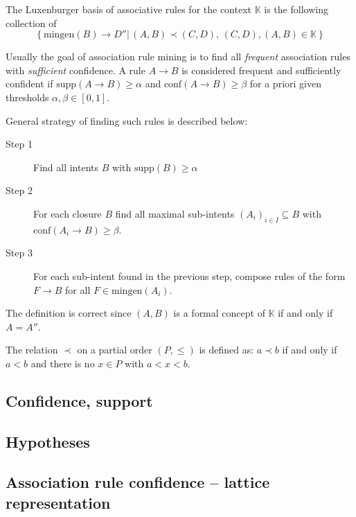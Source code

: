 \documentclass[a4paper]{article}
\newcommand{\obj}[1]{{\left\{ #1 \right \}}}
\newcommand{\clo}[1]{{\left [ #1 \right ]}}
\newcommand{\brac}[1]{{\left ( #1 \right )}}
\newcommand{\induc}[1]{{\left . #1 \right \vert}}
\newcommand{\Ctx}{\mathbb{K}}
\newcommand{\supp}{\text{supp}}
\newcommand{\conf}{\text{conf}}
\begin{document}
The Luxenburger basis of associative rules for the context $\Ctx$ is the following collection of \[\obj{\induc{ \text{mingen}(B)\to D'' }\,(A,B)\prec(C,D),\,(C,D),(A,B)\in \Ctx}\]

Usually the goal of association rule mining is to find all \emph{frequent} association rules with \emph{sufficient} confidence. A rule $A\to B$ is considered frequent and sufficiently confident if $\supp\brac{A\to B}\geq \alpha$ and $\conf\brac{A\to B}\geq \beta$ for a priori given thresholds $\alpha,\beta\in \clo{0,1}$.

General strategy of finding such rules is described below:
\begin{description}
	\item[Step 1] Find all intents $B$ with $\supp(B)\geq \alpha$
	\item[Step 2] For each closure $B$ find all maximal sub-intents $\brac{A_i}_{i\in I}\subseteq B$ with $\conf\brac{A_i\to B}\geq \beta$.
	\item[Step 3] For each sub-intent found in the previous step, compose rules of the form $F\to B$ for all $F\in \text{mingen}(A_i)$.
\end{description}

The definition is correct since $(A,B)$ is a formal concept of $\Ctx$ if and only if $A=A''$.

The relation $\prec$ on a partial order $(P,\leq)$ is defined as: $a\prec b$ if and only if $a < b$ and there is no $x\in P$ with $a < x < b$.


\subsection{Confidence, support} %
\label{sub:confidence_support}

\subsection{Hypotheses} %
\label{sub:hypotheses}


\subsection{Association rule confidence -- lattice representation} %
\label{sub:association_rule_confidence_lattice_representation}
\end{document}
